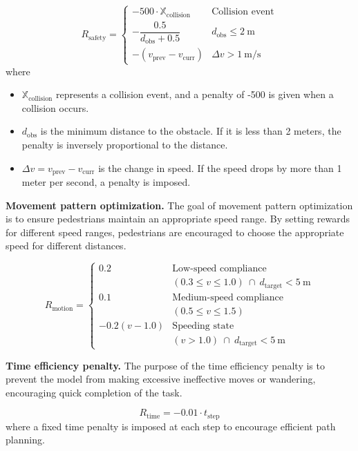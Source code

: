 \documentclass[lettersize,journal]{IEEEtran}
\begin{document}
\begin{equation}
	R_{\text{safety}} =
	\begin{cases}
		-500 \cdot \mathbb{X}_{\text{collision}} & \text{Collision event} \\
		-\dfrac{0.5}{d_{\text{obs}} + 0.5} & d_{\text{obs}} \leq 2\ \text{m} \\
		-(v_{\text{prev}} - v_{\text{curr}}) & \Delta v > 1\ \text{m/s}
	\end{cases}
\end{equation}
where
\begin{itemize}
	\item \( \mathbb{X}_{\text{collision}} \) represents a collision event, and a penalty of -500 is given when a collision occurs.
	\item \( d_{\text{obs}} \) is the minimum distance to the obstacle. If it is less than 2 meters, the penalty is inversely proportional to the distance.
	\item \( \Delta v = v_{\text{prev}} - v_{\text{curr}} \) is the change in speed. If the speed drops by more than 1 meter per second, a penalty is imposed.
\end{itemize}


\textbf{Movement pattern optimization.}
%
The goal of movement pattern optimization is to ensure pedestrians maintain an appropriate speed range. By setting rewards for different speed ranges, pedestrians are encouraged to choose the appropriate speed for different distances.

\begin{equation}
	R_{\text{motion}} =
	\begin{cases}
		0.2 & \text{Low-speed compliance}\\&(0.3 \leq v \leq 1.0)\ \cap\ d_{\text{target}} < 5\ \text{m} \\
		0.1 & \text{Medium-speed compliance}\\&(0.5 \leq v \leq 1.5) \\
		-0.2(v-1.0) & \text{Speeding state} \\& (v > 1.0)\ \cap\ d_{\text{target}} < 5\ \text{m}
	\end{cases}
\end{equation}


\textbf{Time efficiency penalty.}
%
The purpose of the time efficiency penalty is to prevent the model from making excessive ineffective moves or wandering, encouraging quick completion of the task.

\begin{equation}
	R_{\text{time}} = -0.01 \cdot t_{\text{step}}
\end{equation}
where a fixed time penalty is imposed at each step to encourage efficient path planning.
\end{document}
